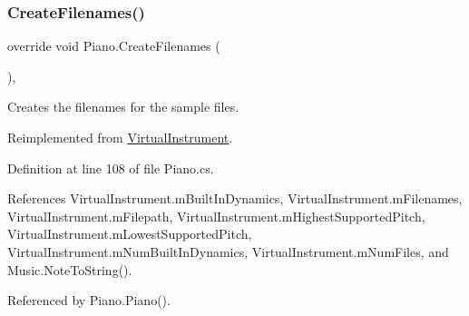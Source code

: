 \subsubsection{\texorpdfstring{Create\+Filenames()}{CreateFilenames()}}
{\footnotesize\ttfamily override void Piano.\+Create\+Filenames (\begin{DoxyParamCaption}{ }\end{DoxyParamCaption})\hspace{0.3cm}{\ttfamily [protected]}, {\ttfamily [virtual]}}



Creates the filenames for the sample files. 



Reimplemented from \hyperlink{group___v_i_base_virt_func_gaacfc9521214176292bfb9665556fb991}{Virtual\+Instrument}.



Definition at line 108 of file Piano.\+cs.



References Virtual\+Instrument.\+m\+Built\+In\+Dynamics, Virtual\+Instrument.\+m\+Filenames, Virtual\+Instrument.\+m\+Filepath, Virtual\+Instrument.\+m\+Highest\+Supported\+Pitch, Virtual\+Instrument.\+m\+Lowest\+Supported\+Pitch, Virtual\+Instrument.\+m\+Num\+Built\+In\+Dynamics, Virtual\+Instrument.\+m\+Num\+Files, and Music.\+Note\+To\+String().



Referenced by Piano.\+Piano().


